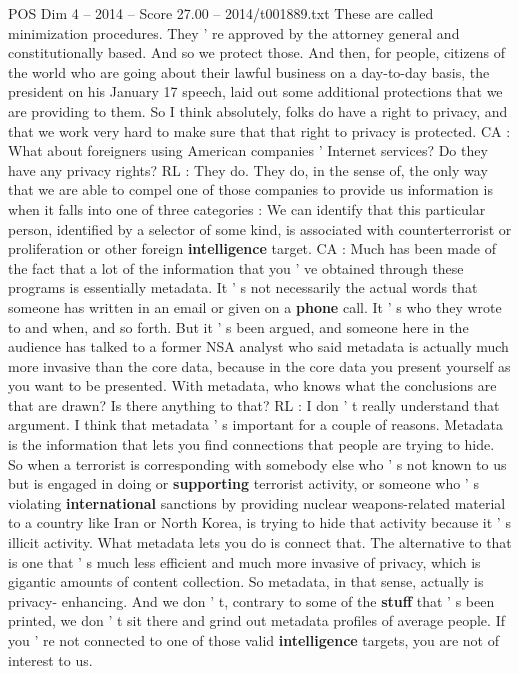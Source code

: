 \begin{textsample}{POS Dim 4 – 2014 – Score 27.00 – 2014/t001889.txt}
These are called minimization procedures.
They ' re approved by the attorney general and constitutionally based.
And so we protect those.
And then, for people, citizens of the world who are going about their lawful business on a day-to-day basis, the president on his January 17 speech, laid out some additional protections that we are providing to them.
So I think absolutely, folks do have a right to privacy, and that we work very hard to make sure that that right to privacy is protected.
CA : What about foreigners using American companies ' Internet services?
Do they have any privacy rights?
RL : They do.
They do, in the sense of, the only way that we are able to compel one of those companies to provide us information is when it falls into one of three categories : We can identify that this particular person, identified by a selector of some kind, is associated with counterterrorist or proliferation or other foreign \textbf{intelligence} target.
CA : Much has been made of the fact that a lot of the information that you ' ve obtained through these programs is essentially metadata.
It ' s not necessarily the actual words that someone has written in an email or given on a \textbf{phone} call.
It ' s who they wrote to and when, and so forth.
But it ' s been argued, and someone here in the audience has talked to a former NSA analyst who said metadata is actually much more invasive than the core data, because in the core data you present yourself as you want to be presented.
With metadata, who knows what the conclusions are that are drawn?
Is there anything to that?
RL : I don ' t really understand that argument.
I think that metadata ' s important for a couple of reasons.
Metadata is the information that lets you find connections that people are trying to hide.
So when a terrorist is corresponding with somebody else who ' s not known to us but is engaged in doing or \textbf{supporting} terrorist activity, or someone who ' s violating \textbf{international} sanctions by providing nuclear weapons-related material to a country like Iran or North Korea, is trying to hide that activity because it ' s illicit activity.
What metadata lets you do is connect that.
The alternative to that is one that ' s much less efficient and much more invasive of privacy, which is gigantic amounts of content collection.
So metadata, in that sense, actually is privacy- enhancing.
And we don ' t, contrary to some of the \textbf{stuff} that ' s been printed, we don ' t sit there and grind out metadata profiles of average people.
If you ' re not connected to one of those valid \textbf{intelligence} targets, you are not of interest to us.

\end{textsample}
